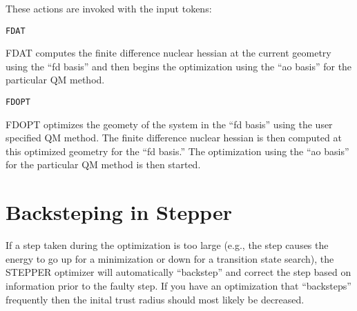These actions are invoked with the input tokens:

\begin{verbatim}
FDAT
\end{verbatim}

FDAT computes the finite difference nuclear hessian at the current
geometry using the ``fd basis'' and then begins the optimization using
the ``ao basis'' for the particular QM method.  

\begin{verbatim}
FDOPT
\end{verbatim}

FDOPT optimizes the geomety of the system in the ``fd basis'' using
the user specified QM method.  The finite difference nuclear hessian
is then computed at this optimized geometry for the ``fd basis.''
The optimization using the ``ao basis'' for the particular QM method
is then started.  

\section{Backsteping in Stepper}

If a step taken during the optimization is too large (e.g., the step
causes the energy to go up for a minimization or down for a transition
state search), the STEPPER optimizer will automatically ``backstep'' and
correct the step based on information prior to the faulty step.  If
you have an optimization that ``backsteps'' frequently then the inital
trust radius should most likely be decreased.  



